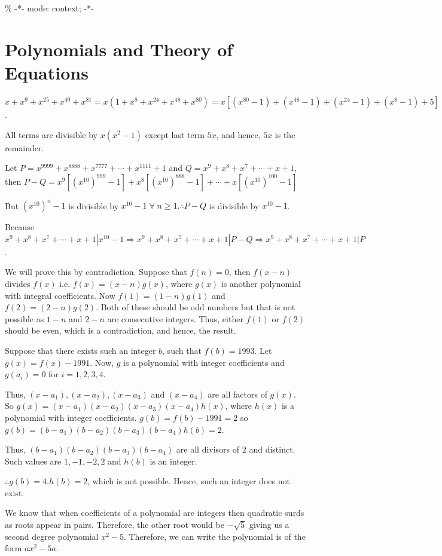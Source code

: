 \% -*- mode: context; -*-
\chapter{Polynomials and Theory of Equations}
\startitemize[n, 1*broad]
\item $x + x^9 + x^{25} + x^{49} + x^{81} = x(1 + x^8 + x^{24} + x^{48} + x^{80}) = x[(x^{80} - 1) + (x^{48}
  - 1) + (x^{24 } - 1) + (x^{8} - 1) + 5]$.

  All terms are divisible by $x(x^2 - 1)$ except last term $5x$, and hence, $5x$ is the remainder.
\item Let $P = x^{9999} + x^{8888} + x^{7777} + \cdots + x^{1111} + 1$ and $Q = x^9 + x^8 + x^7 + \cdots + x
  + 1$, then $P - Q = x^9[(x^{10})^{999} - 1] + x^8[(x^{10})^{888} - 1] + \cdots + x[(x^{10})^{100} - 1]$

  But $(x^{10})^n - 1$ is divisible by $x^{10} - 1\;\forall\;n\geq 1. \therefore P - Q$ is divisible by
  $x^{10} - 1$.

  Because $x^9 + x^8 + x^7 + \cdots + x + 1|x^{10} - 1\Rightarrow x^9 + x^8 + x^7 + \cdots + x + 1|P - Q
  \Rightarrow x^9 + x^8 + x^7 + \cdots + x + 1|P$.
\item We will prove this by contradiction. Suppose that $f(n) = 0$, then $f(x - n)$ divides $f(x)$
  i.e. $f(x) = (x - n)g(x)$, where $g(x)$ is another polynomial with integral coefficients. Now $f(1) = (1 -
  n)g(1)$ and $f(2) = (2 - n)g(2)$. Both of these should be odd numbers but that is not possible as $1 - n$
  and $2 - n$ are consecutive integers. Thus, either $f(1)$ or $f(2)$ should be even, which is a
  contradiction, and hence, the result.
\item Suppose that there exists such an integer $b$, such that $f(b) = 1993$. Let $g(x) = f(x) - 1991$. Now,
  $g$ is a polynomial with integer coefficients and $g(a_i) = 0$ for $i = 1, 2, 3, 4$.

  Thus, $(x - a_1), (x - a_2), (x - a_3)$ and $(x - a_4)$ are all factors of $g(x)$. So $g(x) = (x - a_1)(x
  - a_2)(x - a_3)(x - a_4)h(x)$, where $h(x)$ is a polynomial with integer coefficients. $g(b) = f(b) - 1991
  = 2$ so $g(b) = (b - a_1)(b - a_2)(b - a_3)(b - a_4)h(b) = 2$.

  Thus, $(b - a_1)(b - a_2)(b - a_3)(b - a_4)$ are all divisors of $2$ and distinct. Such values are $1, -1,
  -2, 2$ and $h(b)$ is an integer.

  $\therefore g(b) = 4.h(b) = 2$, which is not possible. Hence, such an integer does not exist.
\item We know that when coefficients of a polynomial are integers then quadratic surds as roots appear in
  pairs. Therefore, the other root would be $-\sqrt{5}$ giving us a second degree polynomial $x^2 -
  5$. Therefore, we can write the polynomial is of the form $ax^2 - 5a$.

